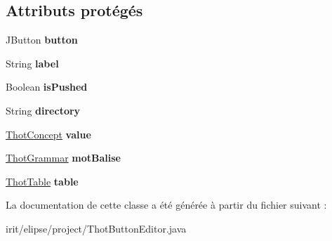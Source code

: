 \subsection*{Attributs protégés}
\begin{DoxyCompactItemize}
\item 
\mbox{\label{classfr_1_1irit_1_1elipse_1_1project_1_1_thot_button_editor_a96fa7f9896116a32bd6e3e3475813eb8}} 
J\+Button {\bfseries button}
\item 
\mbox{\label{classfr_1_1irit_1_1elipse_1_1project_1_1_thot_button_editor_af587b4c751fe409398a7446658e7ba61}} 
String {\bfseries label}
\item 
\mbox{\label{classfr_1_1irit_1_1elipse_1_1project_1_1_thot_button_editor_ae6db153b8757e4cff6b904dc49ebd630}} 
Boolean {\bfseries is\+Pushed}
\item 
\mbox{\label{classfr_1_1irit_1_1elipse_1_1project_1_1_thot_button_editor_ab5000115dfb5795dc5a239bb82e48e38}} 
String {\bfseries directory}
\item 
\mbox{\label{classfr_1_1irit_1_1elipse_1_1project_1_1_thot_button_editor_ac31f6c818861f4aecb0798db937a996a}} 
\mbox{\hyperlink{classfr_1_1irit_1_1elipse_1_1project_1_1_thot_concept}{Thot\+Concept}} {\bfseries value}
\item 
\mbox{\label{classfr_1_1irit_1_1elipse_1_1project_1_1_thot_button_editor_a0d9cb83fe32d93238402d2ae41ca2f4b}} 
\mbox{\hyperlink{classfr_1_1irit_1_1elipse_1_1project_1_1_thot_grammar}{Thot\+Grammar}} {\bfseries mot\+Balise}
\item 
\mbox{\label{classfr_1_1irit_1_1elipse_1_1project_1_1_thot_button_editor_a731ee22a6bbac0ca13ce058b6d5210a5}} 
\mbox{\hyperlink{classfr_1_1irit_1_1elipse_1_1project_1_1_thot_table}{Thot\+Table}} {\bfseries table}
\end{DoxyCompactItemize}


La documentation de cette classe a été générée à partir du fichier suivant \+:\begin{DoxyCompactItemize}
\item 
irit/elipse/project/Thot\+Button\+Editor.\+java\end{DoxyCompactItemize}
